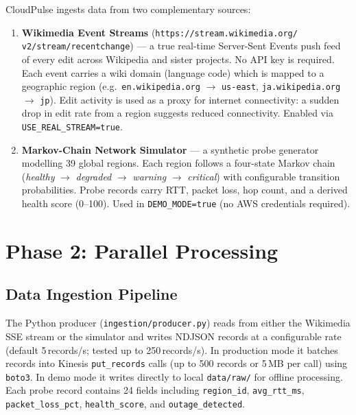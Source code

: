 \documentclass[conference]{IEEEtran}
\begin{document}
CloudPulse ingests data from two complementary sources:

\begin{enumerate}
  \item \textbf{Wikimedia Event Streams} (\texttt{https://stream.wikimedia.org/\\
    v2/stream/recentchange}) — a true real-time Server-Sent Events push feed of
    every edit across Wikipedia and sister projects. No API key is required.
    Each event carries a wiki domain (language code) which is mapped to a
    geographic region (e.g.\ \texttt{en.wikipedia.org} $\to$ \texttt{us-east},
    \texttt{ja.wikipedia.org} $\to$ \texttt{jp}). Edit activity is used as a
    proxy for internet connectivity: a sudden drop in edit rate from a region
    suggests reduced connectivity. Enabled via \texttt{USE\_REAL\_STREAM=true}.

  \item \textbf{Markov-Chain Network Simulator} — a synthetic probe generator
    modelling 39 global regions. Each region follows a four-state Markov chain
    (\textit{healthy} $\to$ \textit{degraded} $\to$ \textit{warning} $\to$
    \textit{critical}) with configurable transition probabilities. Probe records
    carry RTT, packet loss, hop count, and a derived health score (0--100).
    Used in \texttt{DEMO\_MODE=true} (no AWS credentials required).
\end{enumerate}

\section{Phase 2: Parallel Processing}

\subsection{Data Ingestion Pipeline}

The Python producer (\texttt{ingestion/producer.py}) reads from either the
Wikimedia SSE stream or the simulator and writes NDJSON records at a configurable
rate (default 5\,records/s; tested up to 250\,records/s). In production mode it
batches records into Kinesis \texttt{put\_records} calls (up to 500 records or
5\,MB per call) using \texttt{boto3}. In demo mode it writes directly to local
\texttt{data/raw/} for offline processing. Each probe record contains 24 fields
including \texttt{region\_id}, \texttt{avg\_rtt\_ms}, \texttt{packet\_loss\_pct},
\texttt{health\_score}, and \texttt{outage\_detected}.
\end{document}

